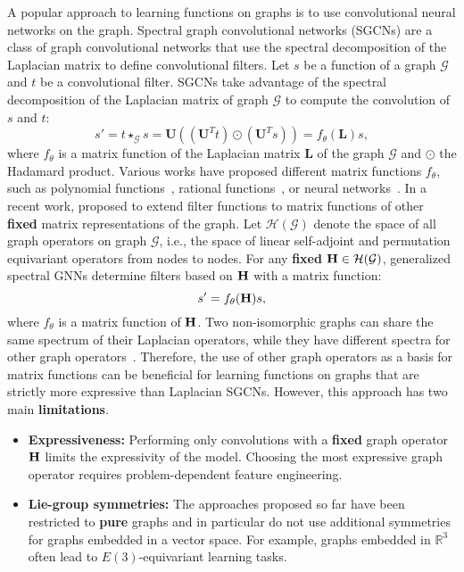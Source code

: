 \documentclass{article} \usepackage{iclr2024_conference,times}
\begin{document}
A popular approach to learning functions on graphs is to use convolutional neural networks on the graph.
Spectral graph convolutional networks (SGCNs)  are a class of graph convolutional networks that use the spectral decomposition of the Laplacian matrix to define convolutional filters.
Let $s$ be a function of a graph $\mathcal{G}$ and $t$ be a convolutional filter. 
SGCNs take advantage of the spectral decomposition of the Laplacian matrix of graph $\mathcal{G}$ to compute the convolution of $s$ and $t$: 
\begin{equation}
\label{eq:sgnn-convolution}
    s' = t \star_{\mathcal{G}} s = \mathbf{U} ((\mathbf{U}^{T} t) \odot (\mathbf{U}^{T} s))
          = f_{\theta}(\mathbf{L}) s,
\end{equation}
where $f_{\theta}$ is a matrix function of the Laplacian matrix $\mathbf{L}$ of the graph $\mathcal{G}$ and $\odot$ the Hadamard product. 
Various works have proposed different matrix functions $f_{\theta}$, such as polynomial functions~\citep{ChebyConv}, rational functions~\citep{ARMA}, or neural networks~\citep{WUGNN2021}.
In a recent work, \cite{yang2023better} proposed to extend filter functions to matrix functions of other \textbf{fixed} matrix representations of the graph.
Let $\mathcal{H}({\mathcal{G}})$ denote the space of all graph operators on graph $\mathcal{G}$, i.e., the space of linear self-adjoint and permutation equivariant operators from nodes to nodes.
For any \textbf{fixed} ${\bf H} \in \mathcal{H}({\mathcal{G}})$, generalized spectral GNNs determine filters based on ${\bf H}$  with a matrix function:
\begin{equation}
    s' = f_{\theta}({\bf H}) s,
\end{equation}
where $f_{\theta}$ is a matrix function of ${\bf H}$. 
Two non-isomorphic graphs can share the same spectrum of their Laplacian operators, while they have different spectra for other graph operators~\citep{JOHNSON198096}.
Therefore, the use of other graph operators as a basis for matrix functions can be beneficial for learning functions on graphs that are strictly more expressive than Laplacian SGCNs.
However, this approach has two main \textbf{limitations}.
\begin{itemize}
    \item \textbf{Expressiveness:} Performing only convolutions with a \textbf{fixed} graph operator ${\bf H}$ limits the expressivity of the model. Choosing the most expressive graph operator requires problem-dependent feature engineering.
    \item \textbf{Lie-group symmetries:} The approaches proposed so far have been restricted to \textbf{pure} graphs and in particular do not use additional symmetries for graphs embedded in a vector space. For example, graphs embedded in $\mathbb{R}^3$ often lead to $E(3)$-equivariant learning tasks.
\end{itemize}
\end{document}
